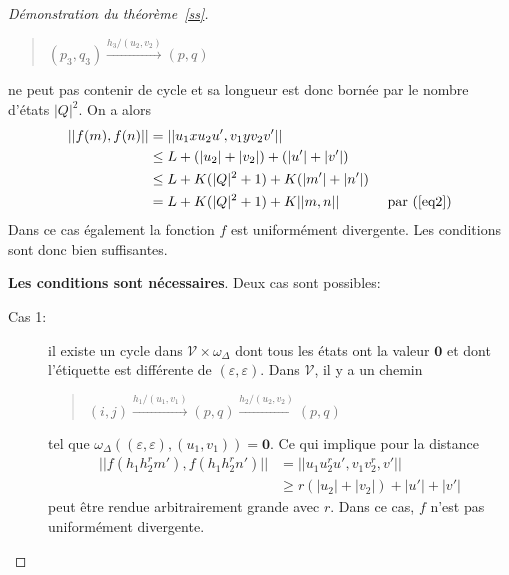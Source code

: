 \begin{proof}[Démonstration du théorème~\ref{ss}]
\begin{description}
	    	\begin{quotation}
	    		$(p_3,q_3) \xrightarrow{h_3/(u_2,v_2)} (p,q)$
	    	\end{quotation}
	    	ne peut pas contenir de cycle et sa longueur est donc bornée par le nombre d'états $|Q|^2$. On a alors
	    	\begin{align*}
	    		||f(m),f(n)|| &= ||u_1xu_2u',v_1yv_2v'|| \\
					    	  &\leq L + (|u_2|+|v_2|) + (|u'| + |v'|) \\
					    	  &\leq L + K(|Q|^2 + 1) + K(|m'| + |n'|) \\
					    	  &= L + K(|Q|^2 + 1) + K||m,n|| & \text{ par~(\ref{eq2})}
	    	\end{align*}
	    	Dans ce cas également la fonction $f$ est uniformément divergente. Les conditions sont donc bien suffisantes.
	    \end{description}
	    \textbf{Les conditions sont nécessaires}. Deux cas sont possibles:
	    \begin{description}
	    	\item[Cas 1:] il existe un cycle dans $\mathscr{V} \times \omega_\Delta$ dont tous les états ont la valeur $\mathbf{0}$ et dont l'étiquette est différente de $(\varepsilon,\varepsilon)$. Dans $\mathscr{V}$, il y a un chemin
	    	\begin{quotation}
	    		$(i,j) \xrightarrow{h_1/(u_1,v_1)} (p,q) \xrightarrow{h_2/(u_2,v_2)} (p,q)$
	    	\end{quotation}
	    	tel que $\omega_\Delta((\varepsilon,\varepsilon),(u_1,v_1)) = \mathbf{0}$. Ce qui implique pour la distance
	    	\begin{align*}
		    	||f(h_1h_2^rm'),f(h_1h_2^rn')|| &= ||u_1u_2^ru',v_1v_2^r,v'|| \\
										    	&\geq r(|u_2|+|v_2|) + |u'| + |v'|
	    	\end{align*}
	    	peut être rendue arbitrairement grande avec $r$. Dans ce cas, $f$ n'est pas uniformément divergente.
	    	

\end{description}
\end{proof}
